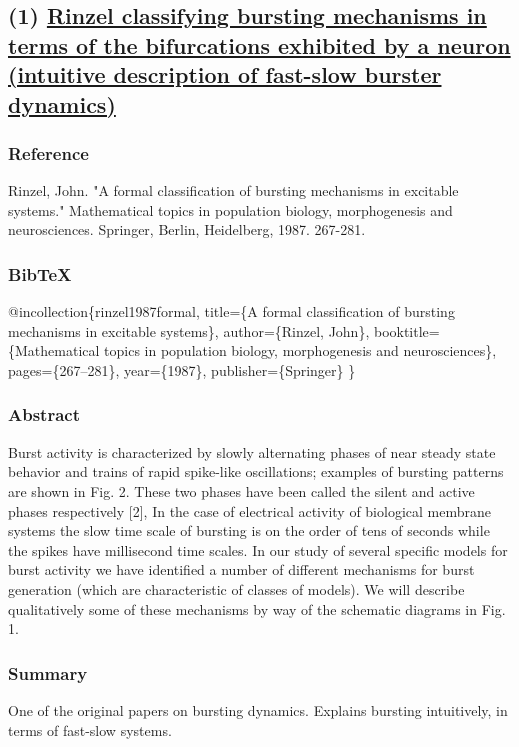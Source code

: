 \documentclass[11pt]{article}
\begin{document}
\subsection{(1) \href{http://www-sop.inria.fr/members/Mathieu.Desroches/files/Rinzel\_ICM1986.pdf}{Rinzel classifying bursting mechanisms in terms of the bifurcations exhibited by a neuron (intuitive description of fast-slow burster dynamics)}}
\label{sec:org561c4c5}
\subsubsection{Reference}
\label{sec:org7aa4776}
Rinzel, John. "A formal classification of bursting mechanisms in excitable systems." Mathematical topics in population biology, morphogenesis and neurosciences. Springer, Berlin, Heidelberg, 1987. 267-281.

\subsubsection{BibTeX}
\label{sec:orgfcff1f8}
@incollection\{rinzel1987formal,
  title=\{A formal classification of bursting mechanisms in excitable systems\},
  author=\{Rinzel, John\},
  booktitle=\{Mathematical topics in population biology, morphogenesis and neurosciences\},
  pages=\{267--281\},
  year=\{1987\},
  publisher=\{Springer\}
\}

\subsubsection{Abstract}
\label{sec:org7263abc}
Burst activity is characterized by slowly alternating phases of near
steady state behavior and trains of rapid spike-like oscillations;
examples of bursting patterns are shown in Fig. 2. These two phases
have been called the silent and active phases respectively [2], In the
case of electrical activity of biological membrane systems the slow
time scale of bursting is on the order of tens of seconds while the
spikes have millisecond time scales. In our study of several specific
models for burst activity we have identified a number of different
mechanisms for burst generation (which are characteristic of classes
of models). We will describe qualitatively some of these mechanisms by
way of the schematic diagrams in Fig. 1.

\subsubsection{Summary}
\label{sec:orgde798c7}
One of the original papers on bursting dynamics. 
Explains bursting intuitively, in terms of fast-slow systems.
\end{document}
